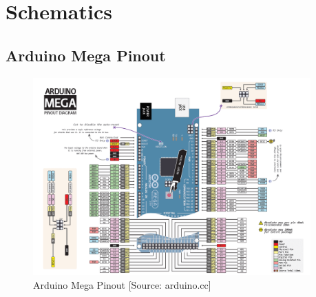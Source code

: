 \pagebreak
\section{Schematics}
\subsection{Arduino Mega Pinout} 
\label{megaPinout}
\vspace{-2cm}
\begin{figure}[H]
	\centering
\includegraphics[angle=90,origin=c,width=0.95\textwidth]{figures/megaPinout.png}
	\caption{Arduino Mega Pinout [Source: arduino.cc]}
	\label{megaPinoutPic}
\end{figure}
